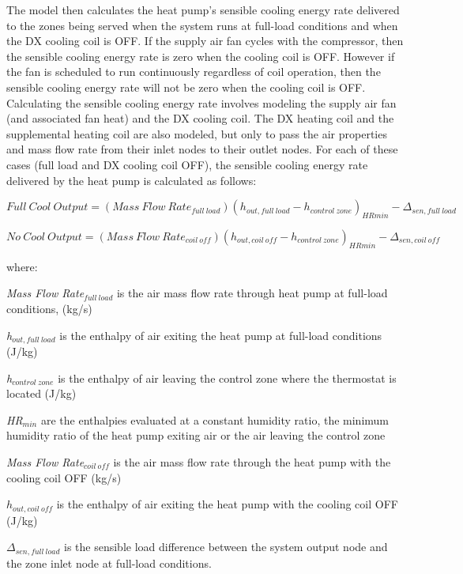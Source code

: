 The model then calculates the heat pump's sensible cooling energy rate delivered to the zones being served when the system runs at full-load conditions and when the DX cooling coil is OFF. If the supply air fan cycles with the compressor, then the sensible cooling energy rate is zero when the cooling coil is OFF. However if the fan is scheduled to run continuously regardless of coil operation, then the sensible cooling energy rate will not be zero when the cooling coil is OFF. Calculating the sensible cooling energy rate involves modeling the supply air fan (and associated fan heat) and the DX cooling coil. The DX heating coil and the supplemental heating coil are also modeled, but only to pass the air properties and mass flow rate from their inlet nodes to their outlet nodes. For each of these cases (full load and DX cooling coil OFF), the sensible cooling energy rate delivered by the heat pump is calculated as follows:

\begin{equation}
Full~Cool~Output = (Mass~Flow~Rat{e_{full~load}}){({h_{out,full~load}} - {h_{control~zone}})_{HRmin}} - {\Delta_{sen,full~load}}
\end{equation}

\begin{equation}
No~Cool~Output = (Mass~Flow~Rat{e_{coil~off}}){({h_{out,coil~off}} - {h_{control~zone}})_{HRmin}} - {\Delta_{sen,coil~off}}
\end{equation}

where:

\emph{Mass Flow Rate\(_{full~load}\)} is the air mass flow rate through heat pump at full-load conditions, (kg/s)

\emph{h\(_{out,full~load}\)} is the enthalpy of air exiting the heat pump at full-load conditions (J/kg)

\emph{h\(_{control~zone}\)} is the enthalpy of air leaving the control zone where the thermostat is located (J/kg)

\emph{HR\(_{min}\)} are the enthalpies evaluated at a constant humidity ratio, the minimum humidity ratio of the heat pump exiting air or the air leaving the control zone

\emph{Mass Flow Rate\(_{coil~off}\)} is the air mass flow rate through the heat pump with the cooling coil OFF (kg/s)

\(h_{out,coil~off}\) is the enthalpy of air exiting the heat pump with the cooling coil OFF (J/kg)

\(\Delta_{sen,full~load}\) is the sensible load difference between the system output node and the zone inlet node at full-load conditions.

